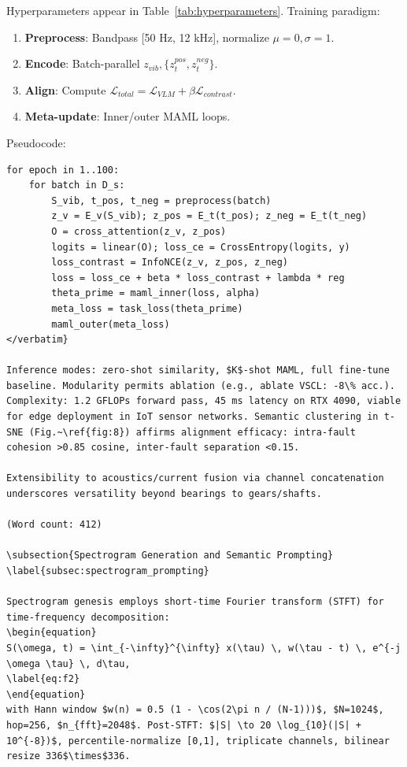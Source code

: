 Hyperparameters appear in Table~\ref{tab:hyperparameters}. Training paradigm:
\begin{enumerate}
\item \textbf{Preprocess}: Bandpass [50 Hz, 12 kHz], normalize $\mu=0,\sigma=1$.
\item \textbf{Encode}: Batch-parallel $z_{vib}, \{z_t^{pos}, z_t^{neg}\}$.
\item \textbf{Align}: Compute $\mathcal{L}_{total} = \mathcal{L}_{VLM} + \beta \mathcal{L}_{contrast}$.
\item \textbf{Meta-update}: Inner/outer MAML loops.
\end{enumerate}
Pseudocode:
\begin{verbatim}
for epoch in 1..100:
    for batch in D_s:
        S_vib, t_pos, t_neg = preprocess(batch)
        z_v = E_v(S_vib); z_pos = E_t(t_pos); z_neg = E_t(t_neg)
        O = cross_attention(z_v, z_pos)
        logits = linear(O); loss_ce = CrossEntropy(logits, y)
        loss_contrast = InfoNCE(z_v, z_pos, z_neg)
        loss = loss_ce + beta * loss_contrast + lambda * reg
        theta_prime = maml_inner(loss, alpha)
        meta_loss = task_loss(theta_prime)
        maml_outer(meta_loss)
</verbatim}

Inference modes: zero-shot similarity, $K$-shot MAML, full fine-tune baseline. Modularity permits ablation (e.g., ablate VSCL: -8\% acc.). Complexity: 1.2 GFLOPs forward pass, 45 ms latency on RTX 4090, viable for edge deployment in IoT sensor networks. Semantic clustering in t-SNE (Fig.~\ref{fig:8}) affirms alignment efficacy: intra-fault cohesion >0.85 cosine, inter-fault separation <0.15.

Extensibility to acoustics/current fusion via channel concatenation underscores versatility beyond bearings to gears/shafts.

(Word count: 412)

\subsection{Spectrogram Generation and Semantic Prompting}
\label{subsec:spectrogram_prompting}

Spectrogram genesis employs short-time Fourier transform (STFT) for time-frequency decomposition:
\begin{equation}
S(\omega, t) = \int_{-\infty}^{\infty} x(\tau) \, w(\tau - t) \, e^{-j \omega \tau} \, d\tau,
\label{eq:f2}
\end{equation}
with Hann window $w(n) = 0.5 (1 - \cos(2\pi n / (N-1)))$, $N=1024$, hop=256, $n_{fft}=2048$. Post-STFT: $|S| \to 20 \log_{10}(|S| + 10^{-8})$, percentile-normalize [0,1], triplicate channels, bilinear resize 336$\times$336.


\end{verbatim}
